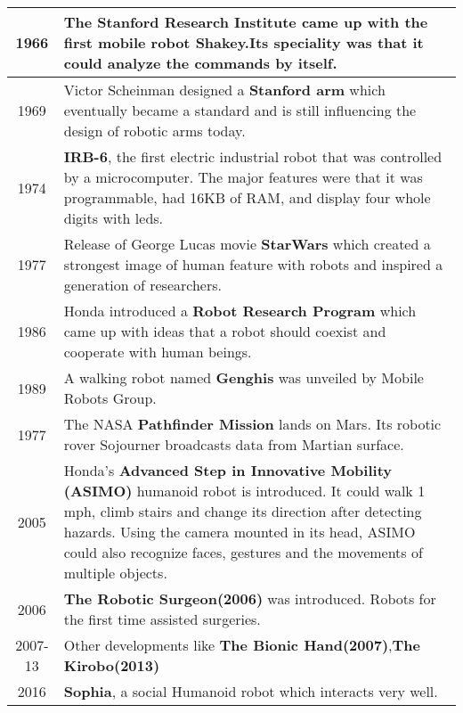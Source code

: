 \begin{table}
\begin{tabular}{|c|p{14cm}|}
        1966 & The Stanford Research Institute came up with the first mobile robot \textbf{Shakey}.Its speciality was that it could analyze the commands by itself. \\ \hline
        \rowcolor[gray]{0.95} 1969 & Victor Scheinman designed a \textbf{Stanford arm} which eventually became a standard and is still influencing the design of robotic arms today. \\ \hline
        1974 & \textbf{IRB-6}, the first electric industrial robot that was controlled by a microcomputer. The major features were that it was programmable, had 16KB of RAM, and display four whole digits with leds. \\ \hline
        \rowcolor[gray]{0.95} 1977 & Release of George Lucas movie \textbf{StarWars} which created a strongest image of human feature with robots and inspired a generation of researchers. \\ \hline
        1986 & Honda introduced a \textbf{Robot Research Program} which came up with ideas that a robot should coexist and cooperate with human beings. \\ \hline
        \rowcolor[gray]{0.95} 1989 & A walking robot named \textbf{Genghis} was unveiled by Mobile Robots Group. \\ \hline
        1977 & The NASA \textbf{Pathfinder Mission} lands on Mars. Its robotic rover Sojourner broadcasts data from Martian surface. \\ \hline
        \rowcolor[gray]{0.95} 2005 &  Honda’s \textbf{Advanced Step in Innovative Mobility (ASIMO)} humanoid robot is introduced. It could walk 1 mph, climb stairs and change its direction after detecting hazards. Using the camera mounted in its head, ASIMO could also recognize faces, gestures and the movements of multiple objects. \\ \hline
        2006 & \textbf{The Robotic Surgeon(2006)} was introduced. Robots for the first time assisted surgeries. \\ \hline
        \rowcolor[gray]{0.95} 2007-13 & Other developments like \textbf{The Bionic Hand(2007)},\textbf{The Kirobo(2013)} \\ \hline
        2016 & \textbf{Sophia}, a social Humanoid robot which interacts very well. \\ \hline
    \end{tabular}
\end{table}